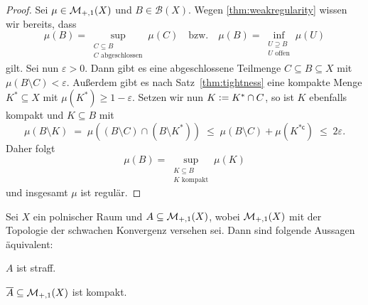 \documentclass[../main/main.tex]{subfiles}
\begin{document}
	\begin{proof}
		Sei $\mu \in \mathcal{M}_{+,1}(X)$ und $B \in \mathcal{B}(X)$. 
		Wegen \ref{thm:weakregularity} wissen wir bereits, dass 
		\[\mu(B) = \sup_{\substack{C \subseteq B \\ C \text{ abgeschlossen}}} \mu(C) 
		\quad \text{bzw.} \quad \mu(B) = \inf_{\substack{U \supseteq B \\ U \text{ offen}}} 
		\mu(U)\]
		gilt. Sei nun $\varepsilon > 0$. Dann gibt es eine abgeschlossene Teilmenge 
		$C \subseteq B \subseteq X$ mit $\mu(B \setminus C) < \varepsilon$. 
		Außerdem gibt es nach Satz~\ref{thm:tightness} eine kompakte Menge 
		$K^\ast \subseteq X$ mit $\mu(K^\ast) \geq 1 - \varepsilon$. Setzen 
		wir nun $K \vcentcolon = K^\ast \cap C$, so ist $K$ ebenfalls kompakt und 
		$K \subseteq B$ mit 
		\[ \mu(B \setminus K) 
		\; = \; \mu((B \setminus C) \cap (B \setminus K^\ast)) 
		\; \leq \; \mu(B \setminus C) + \mu(K^{\ast \mathsf{c}}) 
		\; \leq \; 2 \varepsilon \text{.} \]
		Daher folgt 
		\[\mu(B) 
		= \sup_{\substack{K \subseteq B \\ K \text{ kompakt}}} \mu(K)\] 
		und insgesamt $\mu$ ist regulär.
	\end{proof}

	\begin{Satz}[Prokhorov]
		\label{thm:prokhorov}
		Sei $X$ ein polnischer Raum und $A \subseteq \mathcal{M}_{+,1}(X)$, wobei $\mathcal{M}_{+,1}(X)$ mit der 
		Topologie der schwachen Konvergenz versehen sei. Dann sind folgende Aussagen äquivalent:
		\begin{equivalentthm}
			\item $A$ ist straff.
			\item $\overline{A} \subseteq \mathcal{M}_{+,1}(X)$ ist kompakt.
		\end{equivalentthm}
	\end{Satz}
\end{document}
